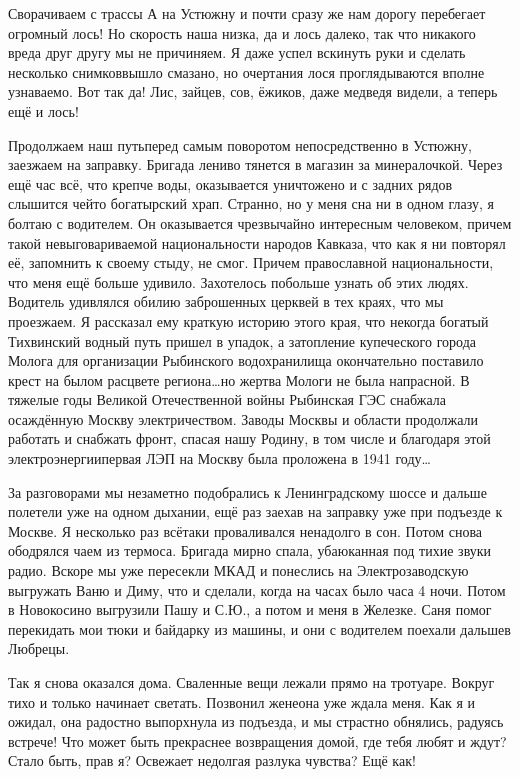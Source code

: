 Сворачиваем с трассы А на Устюжну и почти сразу же нам дорогу перебегает огромный лось! Но скорость наша низка, да и лось далеко, так что никакого вреда друг другу мы не причиняем. Я даже успел вскинуть руки и сделать несколько снимков\mdash вышло смазано, но очертания лося проглядываются вполне узнаваемо. Вот так да! Лис, зайцев, сов, ёжиков, даже медведя видели, а теперь ещё и лось! 

Продолжаем наш путь\mdash перед самым поворотом непосредственно в Устюжну, заезжаем на заправку. Бригада лениво тянется в магазин за минералочкой. Через ещё час всё, что крепче воды, оказывается уничтожено и с задних рядов слышится чей\sdash то богатырский храп. Странно, но у меня сна ни в одном глазу, я болтаю с водителем. Он оказывается чрезвычайно интересным человеком, причем такой невыговариваемой национальности народов Кавказа, что как я ни повторял её, запомнить к своему стыду, не смог. Причем православной национальности, что меня ещё больше удивило. Захотелось побольше узнать об этих людях. Водитель удивлялся обилию заброшенных церквей в тех краях, что мы проезжаем. Я рассказал ему краткую историю этого края, что некогда богатый Тихвинский водный путь пришел в упадок, а затопление купеческого города Молога для организации Рыбинского водохранилища окончательно поставило крест на былом расцвете региона\ldots но жертва Мологи не была напрасной. В тяжелые годы Великой Отечественной войны Рыбинская ГЭС снабжала осаждённую Москву электричеством. Заводы Москвы и области продолжали работать и снабжать фронт, спасая нашу Родину, в том числе и благодаря этой электроэнергии\mdash первая ЛЭП на Москву была проложена в 1941 году\ldots 

За разговорами мы незаметно подобрались к Ленинградскому шоссе и дальше полетели уже на одном дыхании, ещё раз заехав на заправку уже при подъезде к Москве. Я несколько раз всё\sdash таки проваливался ненадолго в сон. Потом снова ободрялся чаем из термоса. Бригада мирно спала, убаюканная под тихие звуки радио. Вскоре мы уже пересекли МКАД и понеслись на Электрозаводскую выгружать Ваню и Диму, что и сделали, когда на часах было часа 4 ночи. Потом в Новокосино выгрузили Пашу и С.Ю., а потом и меня в Железке. Саня помог перекидать мои тюки и байдарку из машины, и они с водителем поехали дальше\mdash в Любрецы. 

Так я снова оказался дома. Сваленные вещи лежали прямо на тротуаре. Вокруг тихо и только начинает светать. Позвонил жене\mdash она уже ждала меня. Как я и ожидал, она радостно выпорхнула из подъезда, и мы страстно обнялись, радуясь встрече! Что может быть прекраснее возвращения домой, где тебя любят и ждут? Стало быть, прав я? Освежает недолгая разлука чувства? Ещё как! 

\begin{center}
\end{center}
